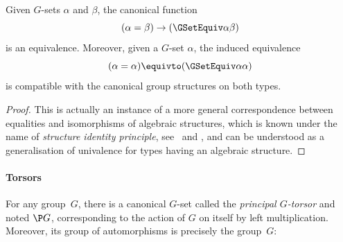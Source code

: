 \begin{proposition}
  \label{GSet-SIP}
  Given $G$-sets $\alpha$ and $\beta$, the canonical function
  \[
    (\alpha=\beta)\to(\GSetEquiv\alpha\beta)
  \]
  is an equivalence.
  Moreover, given a $G$-set $\alpha$, the induced equivalence
  \[
    (\alpha=\alpha)\equivto(\GSetEquiv\alpha\alpha)
  \]
  is compatible with the canonical group structures on both types.
\end{proposition}
\begin{proof}
  This is actually an instance of a more general correspondence between
  equalities and isomorphisms of algebraic structures, which is known under the
  name of \emph{structure identity
    principle}, see~\cite{coquand2013isomorphism} and \cite[Section~9.8]{hottbook}, and can be understood as a
  generalisation of univalence for types having an algebraic structure.
\end{proof}

\paragraph{Torsors}
For any group~$G$, there is a canonical $G$-set called the \emph{principal $G$-torsor} and
noted $\P G$, corresponding to the action of $G$ on itself by left
multiplication. Moreover, its group of automorphisms is precisely the group~$G$:

